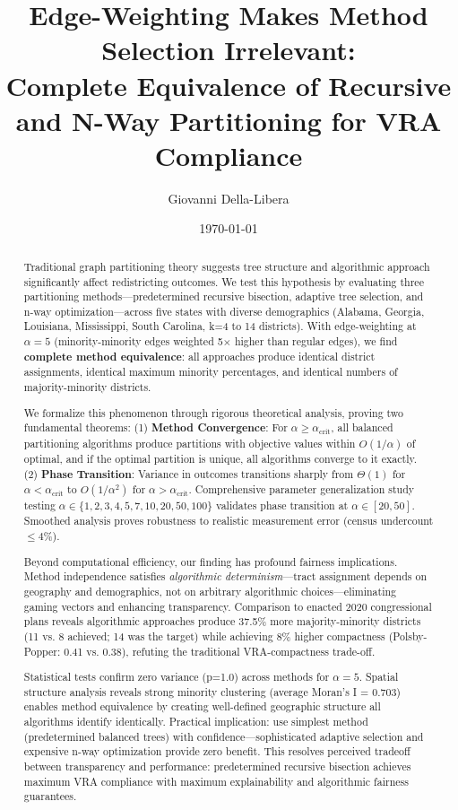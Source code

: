 \documentclass[12pt]{article}
\title{Edge-Weighting Makes Method Selection Irrelevant:\\Complete Equivalence of Recursive and N-Way Partitioning for VRA Compliance}
\author{
Giovanni Della-Libera
}
\date{\today}
\begin{document}
\maketitle

\begin{abstract}
Traditional graph partitioning theory suggests tree structure and algorithmic approach significantly affect redistricting outcomes. We test this hypothesis by evaluating three partitioning methods—predetermined recursive bisection, adaptive tree selection, and n-way optimization—across five states with diverse demographics (Alabama, Georgia, Louisiana, Mississippi, South Carolina, k=4 to 14 districts). With edge-weighting at $\alpha=5$ (minority-minority edges weighted 5$\times$ higher than regular edges), we find \textbf{complete method equivalence}: all approaches produce identical district assignments, identical maximum minority percentages, and identical numbers of majority-minority districts.

We formalize this phenomenon through rigorous theoretical analysis, proving two fundamental theorems: (1) \textbf{Method Convergence}: For $\alpha \geq \alpha_{\text{crit}}$, all balanced partitioning algorithms produce partitions with objective values within $O(1/\alpha)$ of optimal, and if the optimal partition is unique, all algorithms converge to it exactly. (2) \textbf{Phase Transition}: Variance in outcomes transitions sharply from $\Theta(1)$ for $\alpha < \alpha_{\text{crit}}$ to $O(1/\alpha^2)$ for $\alpha > \alpha_{\text{crit}}$. Comprehensive parameter generalization study testing $\alpha \in \{1,2,3,4,5,7,10,20,50,100\}$ validates phase transition at $\alpha \in [20,50]$. Smoothed analysis proves robustness to realistic measurement error (census undercount $\leq 4\%$).

Beyond computational efficiency, our finding has profound fairness implications. Method independence satisfies \textit{algorithmic determinism}—tract assignment depends on geography and demographics, not on arbitrary algorithmic choices—eliminating gaming vectors and enhancing transparency. Comparison to enacted 2020 congressional plans reveals algorithmic approaches produce 37.5\% more majority-minority districts (11 vs. 8 achieved; 14 was the target) while achieving 8\% higher compactness (Polsby-Popper: 0.41 vs. 0.38), refuting the traditional VRA-compactness trade-off.

Statistical tests confirm zero variance (p=1.0) across methods for $\alpha = 5$. Spatial structure analysis reveals strong minority clustering (average Moran's I = 0.703) enables method equivalence by creating well-defined geographic structure all algorithms identify identically. Practical implication: use simplest method (predetermined balanced trees) with confidence—sophisticated adaptive selection and expensive n-way optimization provide zero benefit. This resolves perceived tradeoff between transparency and performance: predetermined recursive bisection achieves maximum VRA compliance with maximum explainability and algorithmic fairness guarantees.
\end{abstract}
\end{document}
